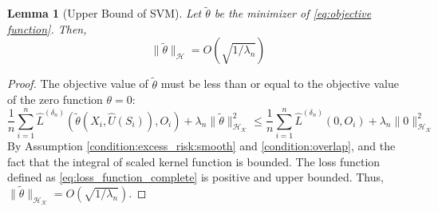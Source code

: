 \documentclass[12pt]{article}
\newtheorem{lemma}{Lemma}%
\begin{document}
\begin{lemma}[Upper Bound of SVM]\label{lemma:bound_svm} Let $\tilde\theta$ be the minimizer of \eqref{eq:objective function}. Then, 
$$\|\tilde\theta\|_{\mathcal{H}}=O(\sqrt{1/\lambda_n}) $$
\end{lemma}

\begin{proof}
The objective value of $\tilde\theta$ must be less than or equal to the objective value of the zero function $\theta = 0$:
$$\frac{1}{n}\sum_{i=1}^n \widehat L^{({\delta_n})}(\tilde\theta(X_i,\widehat U(S_i)),O_i)+\lambda_n\|\tilde\theta\|^2_{\mathcal{H}_\mathcal{K}}\leq \frac{1}{n}\sum_{i=1}^n \widehat L^{({\delta_n})}(0,O_i)+\lambda_n\|0\|^2_{\mathcal{H}_\mathcal{K}}$$
By Assumption \ref{condition:excess_risk:smooth} and \ref{condition:overlap}, and the fact that the integral of scaled kernel function is bounded. The loss function defined as \eqref{eq:loss_function_complete} is positive and upper bounded. Thus, $\|\tilde\theta\|_{\mathcal{H}_\mathcal{K}}= O(\sqrt{1/\lambda_n})$.

\end{proof}
\end{document}
